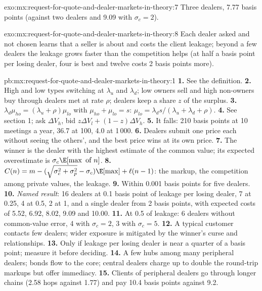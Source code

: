 \begin{solution}{exo:mx:request-for-quote-and-dealer-markets-in-theory:7}
Three dealers, 7.77 basis points (against two dealers and 9.09 with $\sigma_c=2$).
\end{solution}

\begin{solution}{exo:mx:request-for-quote-and-dealer-markets-in-theory:8}
Each dealer asked and not chosen learns that a seller is about and costs the client leakage; beyond a few dealers the leakage grows faster than the
competition helps (at half a basis point per losing dealer, four is best and twelve costs 2 basis points more).
\end{solution}

\begin{solution}{pb:mx:request-for-quote-and-dealer-markets-in-theory:1}
\textbf{1.} See the definition.
\textbf{2.} High and low types switching at $\lambda_u$ and $\lambda_d$; low owners sell and high non-owners buy through dealers met at rate $\rho$;
dealers keep a share $z$ of the surplus.
\textbf{3.} $\lambda_d\mu_{ho}=(\lambda_u+\rho)\mu_{lo}$ with $\mu_{ho}+\mu_{lo}=s$: $\mu_{lo}=\lambda_ds/(\lambda_u+\lambda_d+\rho)$.
\textbf{4.} See section 1; ask $\Delta V_h$, bid $z\Delta V_l+(1-z)\Delta V_h$.
\textbf{5.} It falls: 210 basis points at 10 meetings a year, 36.7 at 100, 4.0 at 1\,000.
\textbf{6.} Dealers submit one price each without seeing the others', and the best price wins at its own price.
\textbf{7.} The winner is the dealer with the highest estimate of the common value; its expected overestimate is $\sigma_c\E[\max\text{ of }n]$.
\textbf{8.} $C(n)=m-(\sqrt{\sigma_c^2+\sigma_p^2}-\sigma_c)\E[\max]+\ell(n-1)$: the markup, the competition among private values, the leakage.
\textbf{9.} Within 0.001 basis points for five dealers.
\textbf{10.} \emph{Named result}: 16 dealers at 0.1 basis point of leakage per losing dealer, 7 at 0.25, 4 at 0.5, 2 at 1, and a single dealer from 2
basis points, with expected costs of 5.52, 6.92, 8.02, 9.09 and 10.00.
\textbf{11.} At 0.5 of leakage: 6 dealers without common-value error, 4 with $\sigma_c=2$, 3 with $\sigma_c=5$.
\textbf{12.} A typical customer contacts few dealers; wider exposure is mitigated by the winner's curse and relationships.
\textbf{13.} Only if leakage per losing dealer is near a quarter of a basis point; measure it before deciding.
\textbf{14.} A few hubs among many peripheral dealers; bonds flow to the core; central dealers charge up to double the round-trip markups but offer
immediacy.
\textbf{15.} Clients of peripheral dealers go through longer chains (2.58 hops against 1.77) and pay 10.4 basis points against 9.2.

\end{solution}
